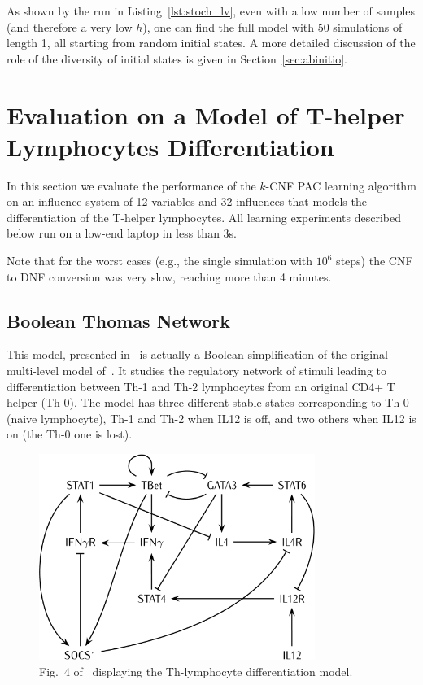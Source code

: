 \documentclass{llncs}
\newif\ifcomments%
\newcommand{\sylvain}[1]{\ifcomments\textcolor{green}{#1}\fi}
\begin{document}
As shown by the run in Listing~\ref{lst:stoch_lv}, even with a low number of
samples (and therefore a very low $h$), one can find the full model with 50
simulations of length 1, all starting from random initial states.
A more detailed discussion of the role of the diversity of initial states is
given in Section~\ref{sec:abinitio}.



\section{Evaluation on a Model of T-helper Lymphocytes Differentiation}\label{ex:lympho}

In this section we evaluate the performance of the $k$-CNF PAC learning
algorithm on an influence system of 12 variables and 32 influences that models
the differentiation of the T-helper lymphocytes.
All learning experiments described below run on a
low-end laptop in less than 3s.
\sylvain{I need to update this}

Note that for the worst cases (e.g., the single simulation with $10^6$ steps)
the CNF to DNF conversion was very slow, reaching more than 4 minutes.

\subsection{Boolean Thomas Network}

This model, presented in~\cite{RRMTC06tcsb} is actually a Boolean
simplification of the original multi-level model
of~\cite{Mendoza06biosystems}. It studies the regulatory network of stimuli
leading to differentiation between Th-1 and Th-2 lymphocytes from an original
CD4+ T helper (Th-0).
The model has three different stable states corresponding to Th-0 (naive
lymphocyte), Th-1 and Th-2 when IL12 is off, and two others when IL12 is on
(the Th-0 one is lost).

\begin{figure}[htbp]
   \centering
   \includegraphics[width=0.8\textwidth]{th_net_clean.png}
   \caption{Fig.~4 of~\cite{RRMTC06tcsb} displaying the Th-lymphocyte
   differentiation model.\label{fig:lympho}}
\end{figure}
\end{document}
